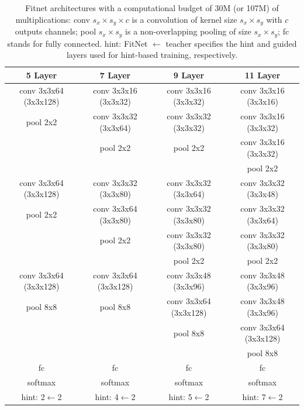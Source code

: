 \documentclass{article} %
\begin{document}
\begin{table}
\center
\begin{tabular}{|c|c|c|c|}
\hline
 5 Layer & 7 Layer & 9 Layer & 11 Layer\\
\hline
\hline
 conv 3x3x64 (3x3x128) &  conv 3x3x16 (3x3x32)  & conv 3x3x16 (3x3x32)  & conv 3x3x16 (3x3x16)\\
 pool 2x2          &  conv 3x3x32 (3x3x64)  & conv 3x3x32 (3x3x32)  & conv 3x3x16 (3x3x32)\\
                   &  pool 2x2          & pool 2x2          & conv 3x3x16 (3x3x32)\\
                   &                    &                   & pool 2x2\\
\hline
 conv 3x3x64 (3x3x128) &  conv 3x3x32 (3x3x80)  & conv 3x3x32 (3x3x64)  & conv 3x3x32 (3x3x48)\\
 pool 2x2          &  conv 3x3x64 (3x3x80)  & conv 3x3x32 (3x3x80)  & conv 3x3x32 (3x3x64)\\
                   &  pool 2x2          & conv 3x3x32 (3x3x80)  & conv 3x3x32 (3x3x80)\\
                   &                    & pool 2x2          & pool 2x2\\
\hline
 conv 3x3x64 (3x3x128) &  conv 3x3x64 (3x3x128) & conv 3x3x48 (3x3x96)  & conv 3x3x48 (3x3x96)\\
 pool 8x8          &  pool 8x8          & conv 3x3x64 (3x3x128) & conv 3x3x48 (3x3x96)\\
                   &                    & pool 8x8          & conv 3x3x64 (3x3x128)\\
                   &                    &                   & pool 8x8\\
\hline
 fc  & fc & fc & fc \\
 softmax  & softmax & softmax & softmax\\
\hline
hint: 2$\leftarrow$2 & hint: 4$\leftarrow$2 & hint: 5$\leftarrow$2 & hint: 7$\leftarrow$2\\
\hline
\end{tabular}

\caption{Fitnet architectures with a computational budget of  30M  (or 107M) of multiplications: conv $s_x \times s_y \times  c$ is a convolution of kernel size $s_x \times  s_y$ with $c$ outputs channels; pool $s_x \times s_y$ is a non-overlapping
pooling of size $s_x \times s_y$; fc stands for fully connected.
 hint: FitNet $\leftarrow$ teacher specifies
the hint and guided layers used for hint-based training, respectively.}
\label{tab:cifar100_depthfitnet}
\end{table}
\end{document}
